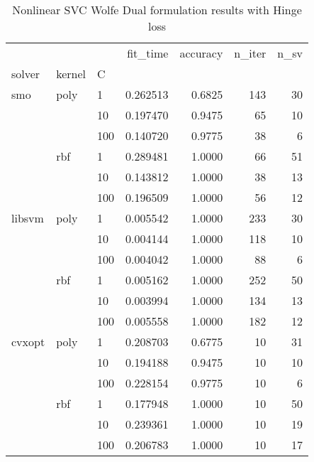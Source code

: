 \begin{table}[H]
\centering
\caption{Nonlinear SVC Wolfe Dual formulation results with Hinge loss}
\label{nonlinear_dual_svc_cv_results}
\begin{tabular}{lllrrrr}
\toprule
       &     &     &  fit\_time &  accuracy &  n\_iter &  n\_sv \\
solver & kernel & C &           &           &         &       \\
\midrule
smo & poly & 1   &  0.262513 &    0.6825 &     143 &    30 \\
       &     & 10  &  0.197470 &    0.9475 &      65 &    10 \\
       &     & 100 &  0.140720 &    0.9775 &      38 &     6 \\
       & rbf & 1   &  0.289481 &    1.0000 &      66 &    51 \\
       &     & 10  &  0.143812 &    1.0000 &      38 &    13 \\
       &     & 100 &  0.196509 &    1.0000 &      56 &    12 \\
libsvm & poly & 1   &  0.005542 &    1.0000 &     233 &    30 \\
       &     & 10  &  0.004144 &    1.0000 &     118 &    10 \\
       &     & 100 &  0.004042 &    1.0000 &      88 &     6 \\
       & rbf & 1   &  0.005162 &    1.0000 &     252 &    50 \\
       &     & 10  &  0.003994 &    1.0000 &     134 &    13 \\
       &     & 100 &  0.005558 &    1.0000 &     182 &    12 \\
cvxopt & poly & 1   &  0.208703 &    0.6775 &      10 &    31 \\
       &     & 10  &  0.194188 &    0.9475 &      10 &    10 \\
       &     & 100 &  0.228154 &    0.9775 &      10 &     6 \\
       & rbf & 1   &  0.177948 &    1.0000 &      10 &    50 \\
       &     & 10  &  0.239361 &    1.0000 &      10 &    19 \\
       &     & 100 &  0.206783 &    1.0000 &      10 &    17 \\
\bottomrule
\end{tabular}
\end{table}
